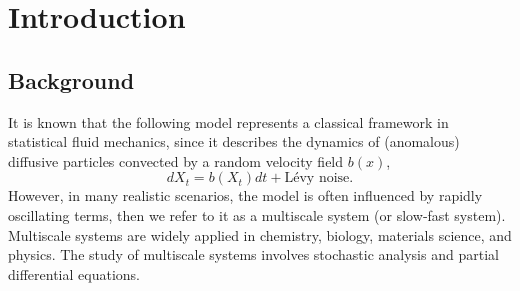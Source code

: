 \documentclass[11pt,reqno]{amsart}
\numberwithin{equation}{section}
\begin{document}
\section{Introduction}

\subsection{Background}
It is known that the following model represents a classical framework in
statistical fluid mechanics, since it describes the dynamics of (anomalous) diffusive particles convected by a random velocity field $b(x)$,
$$
dX_t=b(X_t) dt+ \text{L\'evy noise}.
$$
However, in many realistic scenarios, the model is often influenced by rapidly oscillating terms, 
then we refer to it as a multiscale system (or slow‑fast system). Multiscale systems are widely applied in chemistry, biology, materials science, and physics. The study of multiscale systems involves stochastic analysis and partial differential equations.
\end{document}
